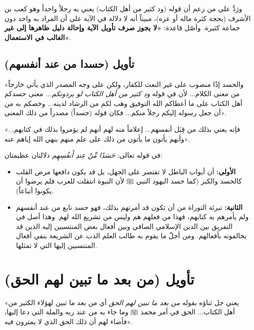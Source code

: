ورَدَّ  على من زعم أن قوله (ود كثير من أهل الكتاب) يعني به رجلاً واحداً وهو كعب بن الأشرف (بحجة كثرة ماله أو عزه)، مبيناً أنه لا دلالة في الآية على أن المراد به واحد دون جماعة كثيرة.
وأصّل قاعدة: \textbf{«لا يجوز صرف تأويل الآية وإحالة دليل ظاهرها إلى غير الغالب في الاستعمال»}.

\subsection{تأويل (حسدا من عند أنفسهم)}
 «والحسد إذًا منصوب على غير النعت للكفار، ولكن على وجه المصدر الذي يأتي خارجاً من معنى الكلام... لأن في قوله \textit{ود كثير من أهل الكتاب لو يردونكم...} معنى حسدكم أهل الكتاب على ما أعطاكم الله التوفيق وهب لكم من الرشاد لدينه... وخصكم به من أن جعل رسوله إليكم رجلاً منكم... فكان قوله (حسداً) مصدراً من ذلك المعنى».

 «فإنه يعني بذلك من قِبَل أنفسهم... إعلاماً منه لهم أنهم لم يؤمروا بذلك في كتابهم... وأنهم يأتون ما يأتون من ذلك على علم منهم بنهي الله إياهم عنه».

\begin{fawaid}
في قوله تعالى: \textit{حَسَدًا مِّنْ عِندِ أَنفُسِهِم} دلالتان عظيمتان: 
\begin{itemize}
    \item \textbf{الأولى:} أن أبواب الباطل لا تقتصر على الجهل، بل قد يكون دافعها مرض القلب كالحسد والكبر (كما حسد اليهود النبي ﷺ لأن النبوة انتقلت للعرب فلم يرضوا أن يكونوا أتباعاً). 
    \item \textbf{الثانية:} تبرئة التوراة من أن تكون قد أمرتهم بذلك، فهو حسد نابع من عند أنفسهم ولم يأمرهم به كتابهم، فهذا من فعلهم هم وليس من تشريع الله لهم. وهذا أصل في التفريق بين الدين الإسلامي الصافي وبين أفعال بعض المنتسبين إليه الذين قد يخالفونه بأفعالهم. ومن أجلّ ما يقوم به طالب العلم الذب عن الشريعة بنفي أفعال المنتسبين إليها التي لا تمثلها.
\end{itemize}
\end{fawaid}

\separator

\section{تأويل (من بعد ما تبين لهم الحق)}
 «يعني جل ثناؤه بقوله \textit{من بعد ما تبين لهم الحق} أي من بعد ما تبين لهؤلاء الكثير من أهل الكتاب... الحق في أمر محمد ﷺ وما جاء به من عند ربه والملة التي دعا إليها، فأضاء لهم أن ذلك الحق الذي لا يمترون فيه».

